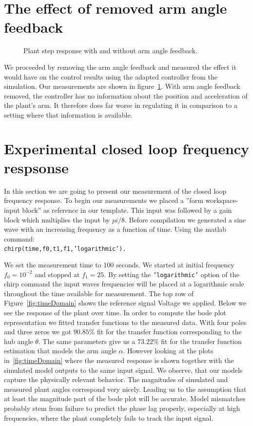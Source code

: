 \documentclass[ twoside,openright,titlepage,numbers=noenddot,headinclude,%
                footinclude=true,cleardoublepage=empty,abstractoff, %
                BCOR=5mm,paper=a4,fontsize=11pt,%
                ngerman,american,%
                ]{scrreprt}
\begin{document}
{\section{The effect of removed arm angle feedback}
\begin{figure}

\caption{Plant step response with and without arm angle feedback.}
\label{fig:alphaNoAlpha}
\end{figure}
We proceeded by removing the arm angle feedback and measured the effect it would have on the control results using the adapted controller from the simulation. Our measurements are shown in figure~\ref{fig:alphaNoAlpha}. With arm angle feedback removed, the controller has no information about the position and acceleration of the plant's arm. It therefore does far worse in regulating it in comparison to a setting where that information is available. 

\section{Experimental closed loop frequency respsonse}
In this section we are going to present our measurement of the closed loop frequency response. To begin our measurements we placed a ''form workspace-input block'' as reference in our template.  This input was followed by a gain block which multiplies the input by $pi/8$. Before compilation we generated a sine wave with an increasing frequency as a function of time. Using the matlab command: \\ \texttt{chirp(time,f0,t1,f1}\texttt{,'logarithmic').}} We set the measurement time to 100 seconds. We started at initial frequency $f_0 = 10^{-2}$ and stopped at $f_1 = 25$. By setting the \texttt{'logarithmic'} option of the chirp command the input waves frequencies will be placed at a logarithmic scale throughout the time available for measurement. The top row of Figure~\ref{fig:timeDomain} shows the reference signal Voltage we applied. Below we see the response of the plant over time. In order to compute the bode plot representation we fitted transfer functions to the measured data. With four poles and three zeros we got $90.85\%$ fit for the transfer function corresponding to the hub angle $\theta$. The same parameters give us a $73.22\%$ fit for the transfer function estimation that models the arm angle $\alpha$. However looking at the plots in~\ref{fig:timeDomain} where the measured response is shown together with the simulated model outputs to the same input signal. We observe, that our models capture the physically relevant behavior. The magnitudes of simulated and measured plant angles correspond very nicely. Leading us to the assumption that at least the magnitude part of the bode plot will be accurate. Model mismatches probably stem from failure to predict the phase lag properly, especially at high frequencies, where the plant completely fails to track the input signal.
 
\end{document}
